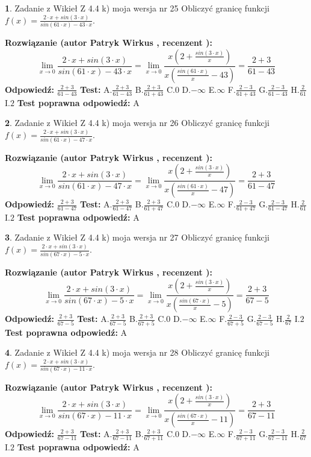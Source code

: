 \documentclass[12pt, a4paper]{article}
\theoremstyle{definition} %
\newtheorem{zad}{}
\newcommand{\zadStart}[1]{\begin{zad}#1\newline}
\newcommand{\zadStop}{\end{zad}}
\newcommand{\rozwStart}[2]{\noindent \textbf{Rozwiązanie (autor #1 , recenzent #2): }\newline}
\newcommand{\rozwStop}{\newline}
\newcommand{\odpStart}{\noindent \textbf{Odpowiedź:}\newline}
\newcommand{\odpStop}{\newline}
\newcommand{\testStart}{\noindent \textbf{Test:}\newline}
\newcommand{\testStop}{\newline}
\newcommand{\kluczStart}{\noindent \textbf{Test poprawna odpowiedź:}\newline}
\newcommand{\kluczStop}{\newline}
\begin{document}
\zadStart{Zadanie z Wikieł Z 4.4 k) moja wersja nr 25}
Obliczyć granicę funkcji $f(x)=\frac{2\cdot x +sin(3\cdot x)}{sin(61\cdot x) -43\cdot x}$.
\zadStop
\rozwStart{Patryk Wirkus}{}
$$\lim\limits_{x\to 0}\frac{2\cdot x +sin(3\cdot x)}{sin(61\cdot x) -43\cdot x}
=\lim\limits_{x\to 0}\frac{x(2+\frac{sin(3\cdot x)}{x})}{x(\frac{sin(61\cdot x)}{x}-43)}
=\frac{2+3}{61-43}$$
\rozwStop
\odpStart
$\frac{2+3}{61-43}$
\odpStop
\testStart
A.$\frac{2+3}{61-43}$
B.$\frac{2+3}{61+43}$
C.$0$
D.$-\infty$
E.$\infty$
F.$\frac{2-3}{61+43}$
G.$\frac{2-3}{61-43}$
H.$\frac{2}{61}$
I.$2$
\testStop
\kluczStart
A
\kluczStop



\zadStart{Zadanie z Wikieł Z 4.4 k) moja wersja nr 26}
Obliczyć granicę funkcji $f(x)=\frac{2\cdot x +sin(3\cdot x)}{sin(61\cdot x) -47\cdot x}$.
\zadStop
\rozwStart{Patryk Wirkus}{}
$$\lim\limits_{x\to 0}\frac{2\cdot x +sin(3\cdot x)}{sin(61\cdot x) -47\cdot x}
=\lim\limits_{x\to 0}\frac{x(2+\frac{sin(3\cdot x)}{x})}{x(\frac{sin(61\cdot x)}{x}-47)}
=\frac{2+3}{61-47}$$
\rozwStop
\odpStart
$\frac{2+3}{61-47}$
\odpStop
\testStart
A.$\frac{2+3}{61-47}$
B.$\frac{2+3}{61+47}$
C.$0$
D.$-\infty$
E.$\infty$
F.$\frac{2-3}{61+47}$
G.$\frac{2-3}{61-47}$
H.$\frac{2}{61}$
I.$2$
\testStop
\kluczStart
A
\kluczStop



\zadStart{Zadanie z Wikieł Z 4.4 k) moja wersja nr 27}
Obliczyć granicę funkcji $f(x)=\frac{2\cdot x +sin(3\cdot x)}{sin(67\cdot x) -5\cdot x}$.
\zadStop
\rozwStart{Patryk Wirkus}{}
$$\lim\limits_{x\to 0}\frac{2\cdot x +sin(3\cdot x)}{sin(67\cdot x) -5\cdot x}
=\lim\limits_{x\to 0}\frac{x(2+\frac{sin(3\cdot x)}{x})}{x(\frac{sin(67\cdot x)}{x}-5)}
=\frac{2+3}{67-5}$$
\rozwStop
\odpStart
$\frac{2+3}{67-5}$
\odpStop
\testStart
A.$\frac{2+3}{67-5}$
B.$\frac{2+3}{67+5}$
C.$0$
D.$-\infty$
E.$\infty$
F.$\frac{2-3}{67+5}$
G.$\frac{2-3}{67-5}$
H.$\frac{2}{67}$
I.$2$
\testStop
\kluczStart
A
\kluczStop



\zadStart{Zadanie z Wikieł Z 4.4 k) moja wersja nr 28}
Obliczyć granicę funkcji $f(x)=\frac{2\cdot x +sin(3\cdot x)}{sin(67\cdot x) -11\cdot x}$.
\zadStop
\rozwStart{Patryk Wirkus}{}
$$\lim\limits_{x\to 0}\frac{2\cdot x +sin(3\cdot x)}{sin(67\cdot x) -11\cdot x}
=\lim\limits_{x\to 0}\frac{x(2+\frac{sin(3\cdot x)}{x})}{x(\frac{sin(67\cdot x)}{x}-11)}
=\frac{2+3}{67-11}$$
\rozwStop
\odpStart
$\frac{2+3}{67-11}$
\odpStop
\testStart
A.$\frac{2+3}{67-11}$
B.$\frac{2+3}{67+11}$
C.$0$
D.$-\infty$
E.$\infty$
F.$\frac{2-3}{67+11}$
G.$\frac{2-3}{67-11}$
H.$\frac{2}{67}$
I.$2$
\testStop
\kluczStart
A
\kluczStop
\end{document}
